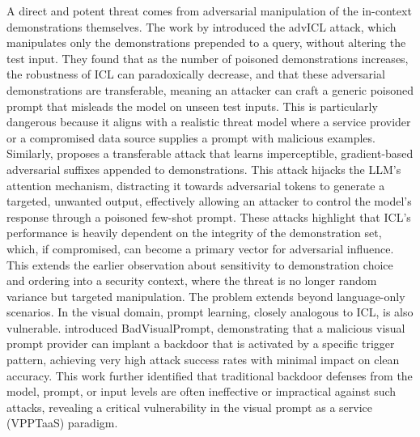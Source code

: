 \documentclass[11pt]{article}
\begin{document}
A direct and potent threat comes from adversarial manipulation of the in-context demonstrations themselves. The work by \cite{ref428} introduced the advICL attack, which manipulates only the demonstrations prepended to a query, without altering the test input. They found that as the number of poisoned demonstrations increases, the robustness of ICL can paradoxically decrease, and that these adversarial demonstrations are transferable, meaning an attacker can craft a generic poisoned prompt that misleads the model on unseen test inputs. This is particularly dangerous because it aligns with a realistic threat model where a service provider or a compromised data source supplies a prompt with malicious examples. Similarly, \cite{ref429} proposes a transferable attack that learns imperceptible, gradient-based adversarial suffixes appended to demonstrations. This attack hijacks the LLM's attention mechanism, distracting it towards adversarial tokens to generate a targeted, unwanted output, effectively allowing an attacker to control the model's response through a poisoned few-shot prompt. These attacks highlight that ICL's performance is heavily dependent on the integrity of the demonstration set, which, if compromised, can become a primary vector for adversarial influence. This extends the earlier observation about sensitivity to demonstration choice and ordering into a security context, where the threat is no longer random variance but targeted manipulation. The problem extends beyond language-only scenarios. In the visual domain, prompt learning, closely analogous to ICL, is also vulnerable. \cite{ref430} introduced BadVisualPrompt, demonstrating that a malicious visual prompt provider can implant a backdoor that is activated by a specific trigger pattern, achieving very high attack success rates with minimal impact on clean accuracy. This work further identified that traditional backdoor defenses from the model, prompt, or input levels are often ineffective or impractical against such attacks, revealing a critical vulnerability in the visual prompt as a service (VPPTaaS) paradigm.
\end{document}
